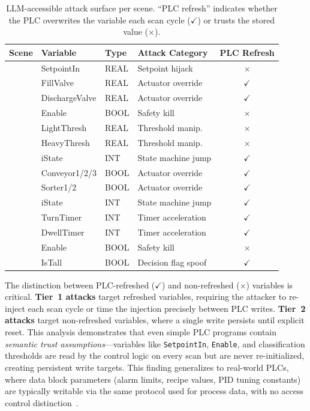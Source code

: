 \begin{table}[h]
\centering
\caption{LLM-accessible attack surface per scene. ``PLC refresh'' indicates whether the PLC overwrites the variable each scan cycle ($\checkmark$) or trusts the stored value ($\times$).}
\label{tab:attack_surface}
\small
\begin{tabular}{@{}llllc@{}}
\toprule
\textbf{Scene} & \textbf{Variable} & \textbf{Type} & \textbf{Attack Category} & \textbf{PLC Refresh} \\
\midrule
{} & SetpointIn & REAL & Setpoint hijack & $\times$ \\
& FillValve & REAL & Actuator override & $\checkmark$ \\
& DischargeValve & REAL & Actuator override & $\checkmark$ \\
& Enable & BOOL & Safety kill & $\times$ \\
\midrule
{} & LightThresh & REAL & Threshold manip. & $\times$ \\
& HeavyThresh & REAL & Threshold manip. & $\times$ \\
& iState & INT & State machine jump & $\checkmark$ \\
& Conveyor1/2/3 & BOOL & Actuator override & $\checkmark$ \\
& Sorter1/2 & BOOL & Actuator override & $\checkmark$ \\
\midrule
{} & iState & INT & State machine jump & $\checkmark$ \\
& TurnTimer & INT & Timer acceleration & $\checkmark$ \\
& DwellTimer & INT & Timer acceleration & $\checkmark$ \\
& Enable & BOOL & Safety kill & $\times$ \\
& IsTall & BOOL & Decision flag spoof & $\checkmark$ \\
\bottomrule
\end{tabular}
\end{table}

The distinction between PLC-refreshed ($\checkmark$) and non-refreshed ($\times$) variables is critical. \textbf{Tier~1 attacks} target refreshed variables, requiring the attacker to re-inject each scan cycle or time the injection precisely between PLC writes. \textbf{Tier~2 attacks} target non-refreshed variables, where a single write persists until explicit reset. This analysis demonstrates that even simple PLC programs contain \emph{semantic trust assumptions}---variables like \texttt{SetpointIn}, \texttt{Enable}, and classification thresholds are read by the control logic on every scan but are never re-initialized, creating persistent write targets. This finding generalizes to real-world PLCs, where data block parameters (alarm limits, recipe values, PID tuning constants) are typically writable via the same protocol used for process data, with no access control distinction~\cite{mclaughlin2016cps_integrity}.

